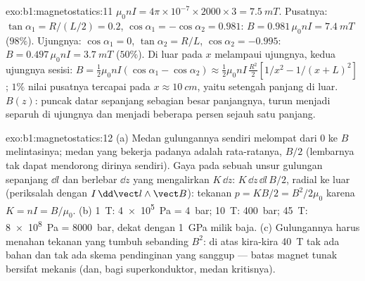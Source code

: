 \begin{solution}{exo:b1:magnetostatics:11}
$\mu_0nI = 4\pi \times 10^{-7} \times 2000 \times 3 = \qty{7.5}{mT}$. Pusatnya: $\tan\alpha_1 =
R/(L/2) = 0.2$, $\cos\alpha_1 = -\cos\alpha_2 = 0.981$: $B = 0.981\,\mu_0nI =
\qty{7.4}{mT}$ ($98\%$). Ujungnya: $\cos\alpha_1 = 0$, $\tan\alpha_2 = R/L$, $\cos\alpha_2 =
-0.995$: $B = 0.497\,\mu_0nI = \qty{3.7}{mT}$ ($50\%$). Di luar pada $x$ melampaui
ujungnya, kedua ujungnya sesisi: $B = \tfrac12\mu_0nI(\cos\alpha_1 - \cos\alpha_2)
\approx \tfrac12\mu_0nI\,\tfrac{R^2}{2}[1/x^2 - 1/(x + L)^2]$; $1\%$ nilai pusatnya
tercapai pada $x \approx \qty{10}{cm}$, yaitu setengah panjang di luar. $B(z)$: puncak datar sepanjang
sebagian besar panjangnya, turun menjadi separuh di ujungnya dan menjadi beberapa persen
sejauh satu panjang.
\end{solution}

\begin{solution}{exo:b1:magnetostatics:12}
(a) Medan gulungannya sendiri melompat dari $0$ ke $B$ melintasinya;
medan yang bekerja padanya adalah rata-ratanya, $B/2$ (lembarnya tak dapat mendorong
dirinya sendiri). Gaya pada sebuah unsur gulungan sepanjang $\dd l$ dan berlebar $\dd z$
yang mengalirkan $K\,\dd z$: $K\,\dd z\,\dd l\,B/2$, radial ke luar (periksalah dengan $I\,\dd\vect l
\wedge\vect B$): tekanan $p = KB/2 = B^2/2\mu_0$ karena $K = nI = B/\mu_0$.
(b) \qty{1}{T}: \qty{4e5}{Pa} = \qty{4}{bar}; \qty{10}{T}: \qty{400}{bar}; \qty{45}{T}:
\qty{8e8}{Pa} = \qty{8000}{bar}, dekat dengan \qty{1}{GPa} milik baja. (c)
Gulungannya harus menahan tekanan yang tumbuh sebanding $B^2$: di atas kira-kira \qty{40}{T}
tak ada bahan dan tak ada skema pendinginan yang sanggup --- batas magnet tunak
bersifat mekanis (dan, bagi superkonduktor, medan kritisnya).
\end{solution}

